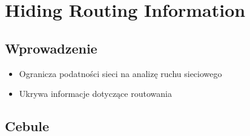 \section{Hiding Routing Information}
    \subsection{Wprowadzenie}
        \begin{itemize}
            \item Ogranicza podatności sieci na analizę ruchu sieciowego
            \item Ukrywa informacje dotyczące routowania
        \end{itemize}

    \subsection{Cebule}
